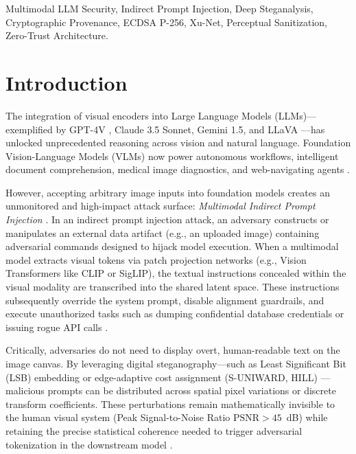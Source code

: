 \documentclass[conference]{IEEEtran}
\begin{document}
\begin{IEEEkeywords}
Multimodal LLM Security, Indirect Prompt Injection, Deep Steganalysis, Cryptographic Provenance, ECDSA P-256, Xu-Net, Perceptual Sanitization, Zero-Trust Architecture.
\end{IEEEkeywords}

\section{Introduction}
\label{sec:intro}

The integration of visual encoders into Large Language Models (LLMs)---exemplified by GPT-4V \cite{achiam2023gpt4}, Claude 3.5 Sonnet, Gemini 1.5, and LLaVA \cite{liu2023visual}---has unlocked unprecedented reasoning across vision and natural language. Foundation Vision-Language Models (VLMs) now power autonomous workflows, intelligent document comprehension, medical image diagnostics, and web-navigating agents \cite{alayrac2022flamingo}. 

However, accepting arbitrary image inputs into foundation models creates an unmonitored and high-impact attack surface: \textit{Multimodal Indirect Prompt Injection} \cite{greshake2023not, bagdasaryan2023abusing}. In an indirect prompt injection attack, an adversary constructs or manipulates an external data artifact (e.g., an uploaded image) containing adversarial commands designed to hijack model execution. When a multimodal model extracts visual tokens via patch projection networks (e.g., Vision Transformers like CLIP or SigLIP), the textual instructions concealed within the visual modality are transcribed into the shared latent space. These instructions subsequently override the system prompt, disable alignment guardrails, and execute unauthorized tasks such as dumping confidential database credentials or issuing rogue API calls \cite{qi2024visual, carlini2024aligned}.

Critically, adversaries do not need to display overt, human-readable text on the image canvas. By leveraging digital steganography---such as Least Significant Bit (LSB) embedding or edge-adaptive cost assignment (S-UNIWARD, HILL) \cite{holub2014designing, li2014new}---malicious prompts can be distributed across spatial pixel variations or discrete transform coefficients. These perturbations remain mathematically invisible to the human visual system (Peak Signal-to-Noise Ratio $\text{PSNR} > 45$~dB) while retaining the precise statistical coherence needed to trigger adversarial tokenization in the downstream model \cite{shayegani2023jailbreak}.
\end{document}

